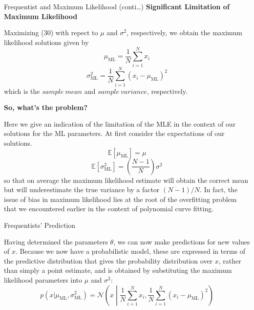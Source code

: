 \documentclass{bredelebeamer}
\begin{document}
\begin{frame}{Frequentist and Maximum Likelihood (conti\ldots)}
  \textbf{Significant Limitation of Maximum Likelihood}\\
  \begin{justify}
    Maximizing (30) with repect to $\mu$ and $\sigma^2$, respectively, we obtain
    the maximum likelihood solutions given by
    \begin{equation}
      \mu_{\textrm{ML}} = \frac{1}{N} \sum_{i=1}^{N} x_i
    \end{equation}
    \begin{equation}
      \sigma^2_{\textrm{ML}} = \frac{1}{N} \sum_{i=1}^{N} {(x_i - \mu_{\textrm{ML}})}^2
    \end{equation}
    which is the $\mathit{sample\ mean}$ and $\mathit{sample\ variance}$, respectively.
  \end{justify}

  \vspace{0.5\baselineskip}
  \textbf{So, what's the problem?}\\
  \begin{justify}
    Here we give an indication of the limitation of the MLE in the context of our
    solutions for the ML parameters. At first consider the expectations of our solutions.
    \begin{equation}
      \mathbb{E} [ \mu_{\textrm{ML}} ] = \mu
    \end{equation}
    \begin{equation}
      \mathbb{E} [ \sigma^2_{\textrm{ML}} ] = (\frac{N-1}{N}) \sigma^2
    \end{equation}
    so that on average the maximum likelihood estimate will obtain the correct mean
    but will underestimate the true variance by a factor ${(N-1)} / N$.
    In fact, the issue of bias in maximum likelihood lies at the root of the overfitting
    problem that we encountered earlier in the context of polynomial curve fitting.
  \end{justify}
\end{frame}

\begin{frame}{Frequentists' Prediction}
  \begin{justify}
    Having determined the parameters $\theta$, we can now make predictions for
    new values of $x$. Because we now have a probabilistic model, these are
    expressed in terms of the predictive distribution that gives the probability
    distribution over $x$, rather than simply a point estimate, and is obtained
    by substituting the maximum likelihood parameters into $\mu$ and $\sigma^2$:
    \begin{equation}
      p(x|\mu_{\textrm{ML}}, \sigma_{\textrm{ML}}^2)
        = \mathcal{N} \left(x \middle| \frac{1}{N} \sum_{i=1}^{N} x_i, \frac{1}{N} \sum_{i=1}^{N} {(x_i - \mu_{\textrm{ML}})}^2 \right)
    \end{equation}
  \end{justify}
\end{frame}
\end{document}
